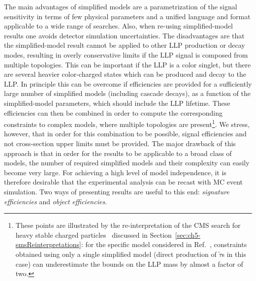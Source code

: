 The main advantages of simplified models are a parametrization of the signal sensitivity in terms of few
physical parameters and a unified language and format applicable to a wide range of searches.
Also, when re-using simplified-model results one avoids detector simulation uncertainties.
The disadvantages are that the simplified-model result
cannot be applied to other LLP production or decay modes, resulting
in overly conservative limits if the LLP signal is composed from
multiple topologies. This can be important if
the LLP is a color singlet, but there are several heavier color-charged states
which can be produced and decay to the LLP.
In principle this can be overcome if efficiencies are provided for a
sufficiently large number of simplified models (including cascade decays), as a
function of the simplified-model parameters, which should include the LLP lifetime.
These efficiencies can then be combined in order to compute the corresponding
constraints to complex models, where multiple topologies are present\footnote{These points are illustrated by the re-interpretation of the CMS search
for heavy stable charged particles~\cite{Khachatryan:2015lla}
discussed in Section~\ref{sec:ch5-smsReinterpretations}:
for the specific model considered in Ref.~\cite{Heisig:2015yla},
constraints obtained using only a single simplified model (direct production of
$\tilde{\tau}$s in this case) can underestimate the bounds on the LLP mass by almost a factor of two.}.
We stress, however, that in order for this combination to be possible, signal efficiencies and
not cross-section upper limits must be provided.
The major drawback of this approach is that in order for the results to be
applicable to a broad class of models, the number of required simplified models
and their complexity can easily become very large.
For achieving a high level of model independence, it is therefore desirable
that the experimental analysis can be recast with MC event simulation.
Two ways of presenting results are useful to this end: {\it signature
efficiencies} and {\it object efficiencies}.







